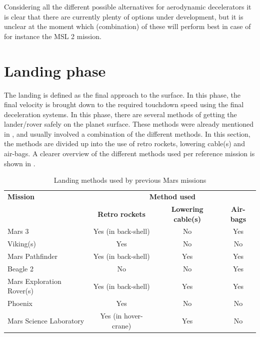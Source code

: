 Considering all the different possible alternatives for aerodynamic decelerators it is clear that there are currently plenty of options under development, but it is unclear at the moment which (combination) of these will perform best in case of for instance the \ac{MSL} 2 mission. 


\section{Landing phase}
\label{sec:landing}
The landing is defined as the final approach to the surface. In this phase, the final velocity is brought down to the required touchdown speed using the final deceleration systems. In this phase, there are several methods of getting the lander/rover safely on the planet surface. These methods were already mentioned in , and usually involved a combination of the different methods. In this section, the methods are divided up into the use of retro rockets, lowering cable(s) and air-bags. A clearer overview of the different methods used per reference mission is shown in .

\begin{table}[!ht]
\begin{center}
\caption{Landing methods used by previous Mars missions}
\label{tab:landingref}
\begin{tabular}{|l|c|c|c|}
\hline 
\textbf{Mission}  		& \multicolumn{3}{c|}{\textbf{Method used}} \\ \cline{2-4}
& \textbf{Retro rockets} & \textbf{Lowering cable(s)} & \textbf{Air-bags}  \\ \hline \hline
Mars 3 		& Yes (in back-shell) & No  & Yes \\ \hline
Viking(s) 		& Yes & No & No \\ \hline
Mars Pathfinder 		& Yes (in back-shell) & Yes & Yes \\ \hline
Beagle 2 		& No & No & Yes \\ \hline
Mars Exploration Rover(s) 		& Yes (in back-shell) & Yes & Yes \\ \hline
Phoenix 		& Yes & No & No \\ \hline
Mars Science Laboratory 		& Yes (in hover-crane) & Yes & No \\ \hline
 		
\end{tabular}
\end{center}
\end{table}
 
